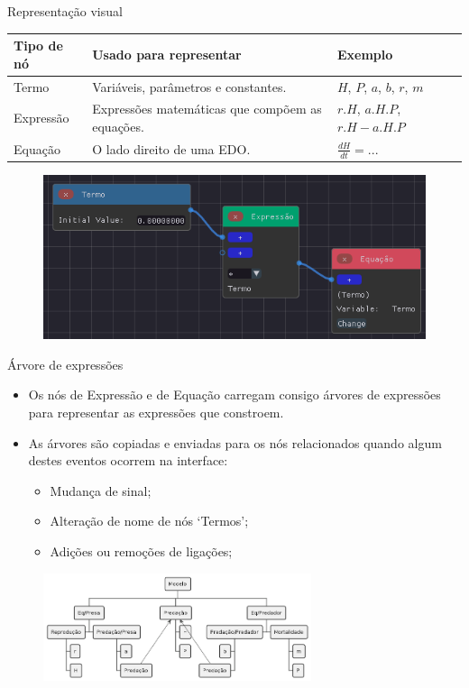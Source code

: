 \begin{frame}{Representação visual}
    \begin{table}
        \begin{center}
        \begin{tabular}{ m{}m{}m{} }
            \toprule
            Tipo de nó & Usado para representar & Exemplo \\
            \midrule
            Termo & Variáveis, parâmetros e constantes. & $H$, $P$, $a$, $b$, $r$, $m$ \\
            Expressão & Expressões matemáticas que compõem as equações. & \(r.H\), \(a.H.P\), \(r.H - a.H.P\)\\
            Equação & O lado direito de uma EDO. & \(\frac{dH}{dt} = ...\) \\
            \bottomrule
        \end{tabular}
        \end{center}
    \end{table}
    \begin{figure}
        \centering
        \includegraphics[width=.6\textwidth]{contents/imgs/ode-designer/tipos-nos-slim.png}
    \end{figure}
\end{frame}

\begin{frame}{Árvore de expressões}
    \begin{itemize}
        \item Os nós de Expressão e de Equação carregam consigo árvores de expressões para representar as expressões que constroem.
        \item As árvores são copiadas e enviadas para os nós relacionados quando algum destes eventos ocorrem na interface:
        \begin{itemize}
            \item Mudança de sinal;
            \item Alteração de nome de nós `Termos';
            \item Adições ou remoções de ligações;
        \end{itemize}
    \end{itemize}
    \begin{figure}
        \centering
        \includegraphics[width=0.7\textwidth]{contents/imgs/expr-tree.png}
    \end{figure}
\end{frame}

